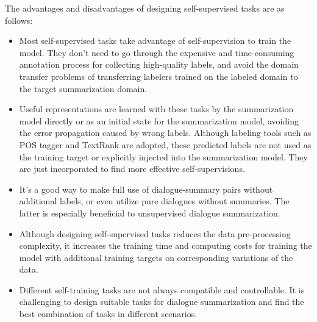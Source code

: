 The advantages and disadvantages of designing self-supervised tasks are as follows:
\begin{itemize}
	\item[\Checkmark] Most self-supervised tasks take advantage of 
self-supervision to train the model. They don't need to go through
the expensive and time-consuming annotation process for collecting 
high-quality labels, and avoid the domain transfer problems 
of transferring labelers trained on the labeled domain to the target 
summarization domain.
	\item[\Checkmark] Useful representations are learned with these tasks by the summarization model directly or as an initial state for the summarization model, avoiding the error propagation caused by wrong labels. Although labeling tools such as POS tagger and TextRank are adopted, these predicted labels are not used as the training target or explicitly injected into the summarization model. They are just incorporated to find more effective self-supervisions.
	\item[\Checkmark] It's a good way to make full use of dialogue-summary 
pairs without additional labels, or even utilize pure dialogues without 
summaries. The latter is especially beneficial to unsupervised 
dialogue summarization.
	\item[\XSolidBrush] Although designing 
self-supervised tasks reduces the data pre-processing complexity, 
it increases the training time and computing costs for training the model 
with additional training targets 
on corresponding variations of the data.
	\item[\XSolidBrush] Different self-training tasks are not always 
compatible and controllable. It is challenging to design suitable tasks for dialogue summarization and 
find the best combination of tasks in different scenarios.
\end{itemize}


